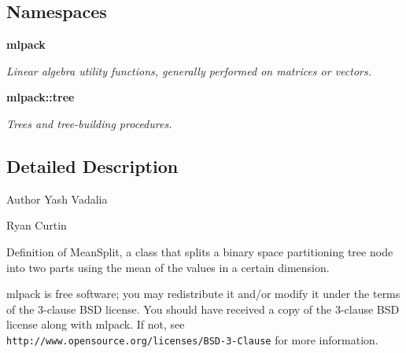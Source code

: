 \subsection*{Namespaces}
\begin{DoxyCompactItemize}
\item 
 {\bf mlpack}
\begin{DoxyCompactList}\small\item\em Linear algebra utility functions, generally performed on matrices or vectors. \end{DoxyCompactList}\item 
 {\bf mlpack\+::tree}
\begin{DoxyCompactList}\small\item\em Trees and tree-\/building procedures. \end{DoxyCompactList}\end{DoxyCompactItemize}


\subsection{Detailed Description}
\begin{DoxyAuthor}{Author}
Yash Vadalia 

Ryan Curtin
\end{DoxyAuthor}
Definition of Mean\+Split, a class that splits a binary space partitioning tree node into two parts using the mean of the values in a certain dimension.

mlpack is free software; you may redistribute it and/or modify it under the terms of the 3-\/clause B\+SD license. You should have received a copy of the 3-\/clause B\+SD license along with mlpack. If not, see {\tt http\+://www.\+opensource.\+org/licenses/\+B\+S\+D-\/3-\/\+Clause} for more information. 